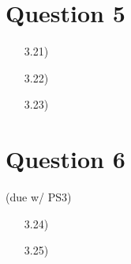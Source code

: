 \documentclass{article}
\begin{document}

\section*{Question 5}
\begin{itemize}
	\item[3.21)]
	
	\item[3.22)]
	
	\item[3.23)]
	
\end{itemize}


\section*{Question 6}
(due w/ PS3)
\begin{itemize}
	\item[3.24)]
	
	\item[3.25)]
	
\end{itemize}


\end{document}
